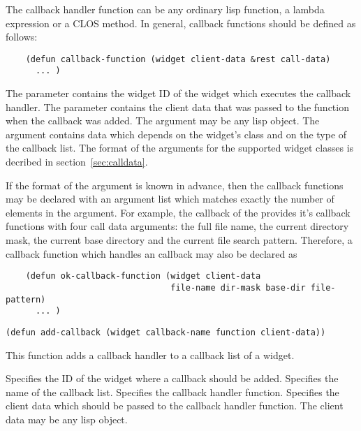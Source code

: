The callback handler function can be any ordinary lisp function, a lambda 
expression or a CLOS method. In general, callback functions should be defined
as follows:

\begin{verbatim}
    (defun callback-function (widget client-data &rest call-data) 
      ... )
\end{verbatim}

The  parameter contains the widget ID of the widget which executes
the callback handler.  The  parameter contains the client data
that was passed to the  function when the callback was added.
The  argument may be any lisp object.  The 
argument contains data which depends on the widget's class and on the type of
the callback list. The format of the  arguments for the
supported widget classes is decribed in section~\ref{sec:calldata}.

If the format of the  argument is known in advance, then the
callback functions may be declared with an argument list which matches exactly
the number of elements in the  argument. For example, the
 callback of the  provides it's callback
functions with four call data arguments: the full file name, the current
directory mask, the current base directory and the current file search pattern.
Therefore, a callback function which handles an  callback may also be
declared as

\begin{verbatim}
    (defun ok-callback-function (widget client-data
                                 file-name dir-mask base-dir file-pattern)
      ... )
\end{verbatim}

\begin{lispd}
\syntax\begin{verbatim}
(defun add-callback (widget callback-name function client-data))
\end{verbatim}
\beschr This function adds a callback handler to a callback list of a widget.

\parameter\begin{paramd}
 Specifies the ID of the widget where a callback should be added.
 Specifies the name of the callback list.
 Specifies the callback handler function.
 Specifies the client data which should be passed to the 
callback handler function. The client data may be any lisp object.
\end{paramd}
\end{lispd}


